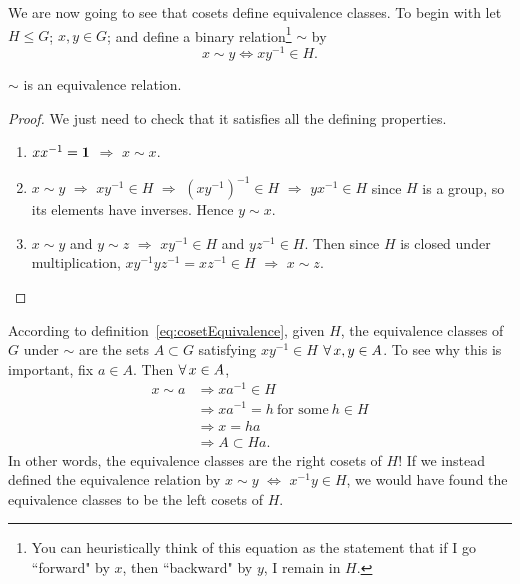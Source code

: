We are now going to see that cosets define equivalence classes. To begin with
let $H\le G$; $x,y\in G$; and define a binary relation\footnote{You can
heuristically think of this equation as the statement that if I go ``forward" by
$x$, then ``backward" by $y$, I remain in $H$.} $\sim$ by
\begin{equation}\label{eq:cosetEquivalence}
  x\sim y \Leftrightarrow xy^{-1}\in H.
\end{equation}
\begin{proposition}{}{}
  $\sim$ is an equivalence relation.
  \begin{proof}
    We just need to check that it satisfies all the defining properties.
    \begin{enumerate}
      \item $xx^{-1}={\mathbf 1}$ $\Rightarrow$ $x\sim x$.
      \item $x\sim y$ $\Rightarrow$ $xy^{-1}\in H$ $\Rightarrow$
            $(xy^{-1})^{-1}\in H$ $\Rightarrow$ $yx^{-1}\in H$
            since $H$ is a group, so its elements have inverses.
            Hence $y\sim x$.
      \item $x\sim y$ and $y\sim z$ $\Rightarrow$ $xy^{-1}\in H$ and
            $yz^{-1}\in H$. Then since $H$ is closed under multiplication,
            $xy^{-1}yz^{-1}=xz^{-1}\in H$ $\Rightarrow$ $x\sim z$.
    \end{enumerate}
  \end{proof}
\end{proposition}
According to definition~\eqref{eq:cosetEquivalence}, given $H$,
the equivalence classes of $G$ under $\sim$ are the sets
$A\subset G$ satisfying $xy^{-1}\in H$ $\operatorname{\forall} x,y\in A$. To see why this is
important, fix $a\in A$. Then $\operatorname{\forall} x\in A$,
\begin{equation}
  \begin{aligned}
    x\sim a &\Rightarrow xa^{-1}\in H \\
            &\Rightarrow xa^{-1}=h~\text{for some}~h\in H\\
            &\Rightarrow x=ha\\
            &\Rightarrow A\subset Ha.
  \end{aligned}
\end{equation}
In other words, the equivalence classes are the right cosets of $H$! If we
instead defined the equivalence relation by $x\sim y$ $\Leftrightarrow$
$x^{-1}y\in H$, we would have found the equivalence classes to be the left
cosets of $H$.
